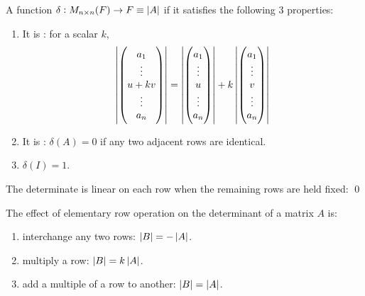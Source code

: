 \begin{theorem}
    A function $\delta: M_{n \times n} (F) \rightarrow F \equiv \displaystyle \left| \displaystyle A \right|$ if it satisfies the following 3 properties:
    \begin{enumerate}
        \item It is : for a scalar $k$, \begin{equation}
        \displaystyle \left| \displaystyle \begin{pmatrix}
            a_1\\
            \vdots\\
            u + kv \\
            \vdots\\
            a_n
        \end{pmatrix} \right| = \displaystyle \left| \displaystyle \begin{pmatrix}
            a_1\\
            \vdots\\
            u \\
            \vdots\\
            a_n
        \end{pmatrix} \right| + k \displaystyle \left| \displaystyle \begin{pmatrix}
            a_1\\
            \vdots\\
            v \\
            \vdots\\
            a_n
        \end{pmatrix} \right|
    \end{equation}
    \item It is : $\delta(A) = 0$ if any two adjacent rows are identical.
    \item $\delta(I) = 1$.
    \end{enumerate}
    The determinate is linear on each row when the remaining rows are held fixed:
    \qed
\end{theorem}



\begin{theorem}
    The effect of elementary row operation on the determinant of a matrix $A$ is:
\begin{enumerate}
    \item interchange any two rows: $\displaystyle \left| \displaystyle B \right| = - \displaystyle \left| \displaystyle A \right|$.
    \item multiply a row: $\displaystyle \left| \displaystyle B \right| = k \displaystyle \left| \displaystyle A \right|$.
    \item add a multiple of a row to another: $\displaystyle \left| \displaystyle B \right| = \displaystyle \left| \displaystyle A \right|$.
\end{enumerate}
\end{theorem}


